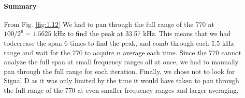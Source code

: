 \documentclass[../main.tex]{subfiles}
\begin{document}
\paragraph*{Summary}
From Fig. \ref{fig:1.12} We had to pan through the full range of the 770 at $100 / 2^6 = 1.5625$ kHz to find the peak at 33.57 kHz.
This means that we had todecrease the span 6 times to find the peak, and comb through each \~1.5 kHz range and wait for the 770 to acquire $n$ average each time.
Since the 770 cannot analyze the full span at small frequency ranges all at once, we had to manually pan through the full range for each iteration. 
Finally, we chose not to look for Signal D as it was only limited by the time it would have taken to pan through the full range of the 770 at even
smaller frequency ranges and larger averaging.
\end{document}
